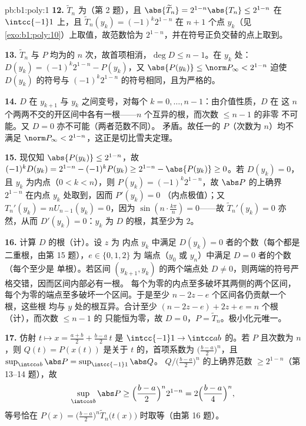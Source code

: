 \begin{solution}{pb:b1:poly:1}
\textbf{12.} $\widetilde T_n$ 为（第 2 题），且
$\abs{\widetilde T_n} = 2^{1-n}\abs{T_n} \leq 2^{1-n}$ 在
$\intcc{-1}1$ 上，且 $\widetilde T_n(y_k) = (-1)^k2^{1-n}$ 在
$n + 1$ 个点 $y_k$（见\cref{exo:b1:poly:10}）上取值，故范数恰为
$2^{1-n}$，并在符号正负交替的点上取到。

\textbf{13.} $\widetilde T_n$ 与 $P$ 均为的
$n$ 次，故首项相消，$\deg D \leq n - 1$。在 $y_k$ 处：
$D(y_k) = (-1)^k2^{1-n} - P(y_k)$，又 $\abs{P(y_k)} \leq \norm
P_\infty < 2^{1-n}$ 迫使 $D(y_k)$ 的符号与
$(-1)^k2^{1-n}$ 的符号相同，且为严格的。

\textbf{14.} $D$ 在 $y_{k+1}$ 与 $y_k$ 之间变号，对每个
$k = 0, \dots, n-1$：由介值性质，$D$ 在
这 $n$ 个两两不交的开区间中各有一根——$n$
个互异的根，而次数 $\leq n - 1$ 的非零
不可能。又 $D = 0$ 亦不可能（两者范数不同）。
矛盾。故任一的 $P$（次数为 $n$）均不满足 $\norm P_\infty <
2^{1-n}$，这正是切比雪夫定理。

\textbf{15.} 现仅知 $\abs{P(y_k)} \leq 2^{1-n}$，故 $(-1)^k
D(y_k) = 2^{1-n} - (-1)^kP(y_k) \geq 2^{1-n} - \abs{P(y_k)} \geq
0$。若 $D(y_k) = 0$，且 $y_k$ 为内点（$0 < k < n$），则
$P(y_k) = (-1)^k2^{1-n}$，故 $\abs P$ 的上确界
$2^{1-n}$ 在内点 $y_k$ 处取到，因而 $P'(y_k) = 0$
（内点极值）；又 $T_n'(y_k) = nU_{n-1}(y_k) = 0$，因为
$\sin(n\cdot\frac{k\pi}n) = 0$——故 $\widetilde T_n'(y_k) = 0$
亦然，从而 $D'(y_k) = 0$：$y_k$ 为 $D$ 的根，其至少为
$2$。

\textbf{16.} 计算 $D$ 的根（计）。设 $z$ 为
内点 $y_k$ 中满足 $D(y_k) = 0$ 者的个数（每个都是
二重根，由第 15 题），$e \in \{0, 1, 2\}$ 为
端点（$y_0$ 或 $y_n$）中满足 $D = 0$ 者的个数（每个至少是
单根）。若区间 $(y_{k+1}, y_k)$ 的两个端点处 $D
\neq 0$，则两端的符号严格交错，因而区间内部必有一根。
每个为零的内点至多破坏其两侧的两个区间，
每个为零的端点至多破坏一个区间。于是至少
$n - 2z - e$ 个区间各仍贡献一个根，这些根
均与 $y$ 处的根互异。合计至少 $(n - 2z - e) + 2z + e = n$
个根（计），而次数 $\leq n - 1$ 的
只能恒为零，故 $D = 0$，$P = \widetilde T_n$。极小化元唯一。

\textbf{17.} 仿射 $t \mapsto x = \frac{a+b}2 +
\frac{b-a}2\,t$ 是 $\intcc{-1}1 \to \intcc ab$ 的。若 $P$
且次数为 $n$，则 $Q(t) = P(x(t))$ 是关于
$t$ 的，首项系数为 $\bigl(\frac{b-a}2\bigr)^n$，且
$\sup_{\intcc ab}\abs P = \sup_{\intcc{-1}1}\abs Q$。 $Q/\bigl(\frac{b-a}2\bigr)^n$ 的上确界范数 $\geq
2^{1-n}$（第 13--14 题），故
\[
\sup_{\intcc ab}\abs P \geq \Bigl(\frac{b-a}2\Bigr)^n 2^{1-n}
= 2\Bigl(\frac{b-a}4\Bigr)^n ,
\]
等号恰在 $P(x) = \bigl(\frac{b-a}2\bigr)^n
\widetilde T_n\bigl(t(x)\bigr)$ 时取等（由第 16 题）。


\end{solution}
